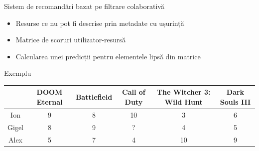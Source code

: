 \documentclass{beamer}
\begin{document}
\begin{frame}{Sistem de recomandări bazat pe filtrare colaborativă}
    \begin{itemize}
        \item Resurse ce nu pot fi descrise prin metadate cu ușurință
        \item Matrice de scoruri utilizator-resursă
        \item Calcularea unei predicții pentru elementele lipsă din matrice
    \end{itemize}
\end{frame}

\begin{frame}{Exemplu}
\begin{center}
\begin{adjustbox}{max size={\textwidth}{\textheight}}
\begin{tabular}{||c c c c c c||} 
 \hline
 & DOOM Eternal & Battlefield & Call of Duty & The Witcher 3: Wild Hunt & Dark Souls III \\ [0.5ex] 
 \hline\hline
 Ion & 9 & 8 & 10 & 3 & 6 \\ 
 \hline
 Gigel & 8 & 9 & ? & 4 & 5  \\
 \hline
 Alex & 5 & 7 & 4 & 10 & 9 \\
 \hline
\end{tabular}
\end{adjustbox}
\end{center}
    
\end{frame}

\end{document}
